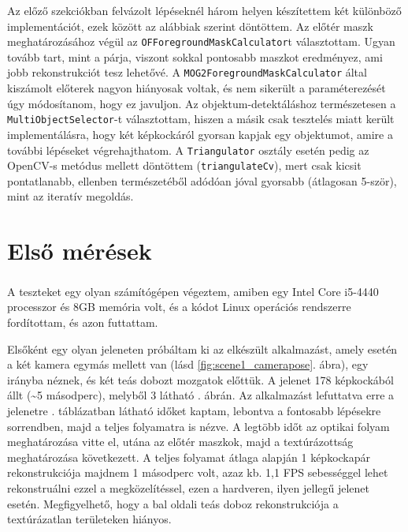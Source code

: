 Az előző szekciókban felvázolt lépéseknél három helyen készítettem két különböző implementációt, ezek között az alábbiak szerint döntöttem. Az előtér maszk meghatározásához végül az \texttt{OFForegroundMaskCalculator}t választottam. Ugyan tovább tart, mint a párja, viszont sokkal pontosabb maszkot eredményez, ami jobb rekonstrukciót tesz lehetővé. A \texttt{MOG2ForegroundMaskCalculator} által kiszámolt előterek nagyon hiányosak voltak, és nem sikerült a paraméterezését úgy módosítanom, hogy ez javuljon. Az objektum-detektáláshoz természetesen a \texttt{MultiObjectSelector}-t választottam, hiszen a másik csak tesztelés miatt került implementálásra, hogy két képkockáról gyorsan kapjak egy objektumot, amire a további lépéseket végrehajthatom. A \texttt{Triangulator} osztály esetén pedig az OpenCV-s metódus mellett döntöttem (\texttt{triangulateCv}), mert csak kicsit pontatlanabb, ellenben természetéből adódóan jóval gyorsabb (átlagosan 5-ször), mint az iteratív megoldás.


\section{Első mérések}

A teszteket egy olyan számítógépen végeztem, amiben egy Intel\textsuperscript{\textregistered} Core\texttrademark{} i5-4440 processzor és 8GB memória volt, és a kódot Linux operációs rendszerre fordítottam, és azon futtattam.

Elsőként egy olyan jeleneten próbáltam ki az elkészült alkalmazást, amely esetén a két kamera egymás mellett van (lásd \ref{fig:scene1_camerapose}. ábra), egy irányba néznek, és két teás dobozt mozgatok előttük. A jelenet 178 képkockából állt (\textasciitilde 5 másodperc), melyből 3 látható . ábrán. Az alkalmazást lefuttatva erre a jelenetre . táblázatban látható időket kaptam, lebontva a fontosabb lépésekre sorrendben, majd a teljes folyamatra is nézve. A legtöbb időt az optikai folyam meghatározása vitte el, utána az előtér maszkok, majd a textúrázottság meghatározása következett. A teljes folyamat átlaga alapján 1 képkockapár rekonstrukciója majdnem 1 másodperc volt, azaz kb. 1,1 FPS sebességgel lehet rekonstruálni ezzel a megközelítéssel, ezen a hardveren, ilyen jellegű jelenet esetén. Megfigyelhető, hogy a bal oldali teás doboz rekonstrukciója a textúrázatlan területeken hiányos.

